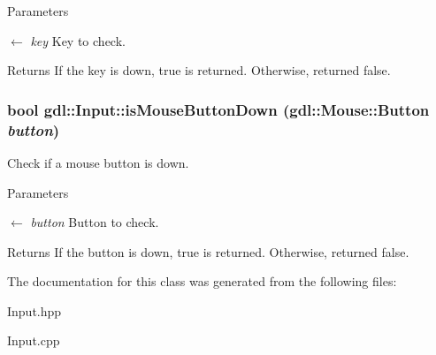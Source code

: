 \begin{DoxyParams}{Parameters}
\item[\mbox{$\leftarrow$} {\em key}]Key to check. \end{DoxyParams}
\begin{DoxyReturn}{Returns}
If the key is down, true is returned. Otherwise, returned false. 
\end{DoxyReturn}
\hypertarget{classgdl_1_1Input_a893c44e94392d6d2d3c01f5ff4263f96}{
\subsubsection[{isMouseButtonDown}]{\setlength{\rightskip}{0pt plus 5cm}bool gdl::Input::isMouseButtonDown (gdl::Mouse::Button {\em button})}}
\label{classgdl_1_1Input_a893c44e94392d6d2d3c01f5ff4263f96}
Check if a mouse button is down.


\begin{DoxyParams}{Parameters}
\item[\mbox{$\leftarrow$} {\em button}]Button to check. \end{DoxyParams}
\begin{DoxyReturn}{Returns}
If the button is down, true is returned. Otherwise, returned false. 
\end{DoxyReturn}


The documentation for this class was generated from the following files:\begin{DoxyCompactItemize}
\item 
Input.hpp\item 
Input.cpp\end{DoxyCompactItemize}

